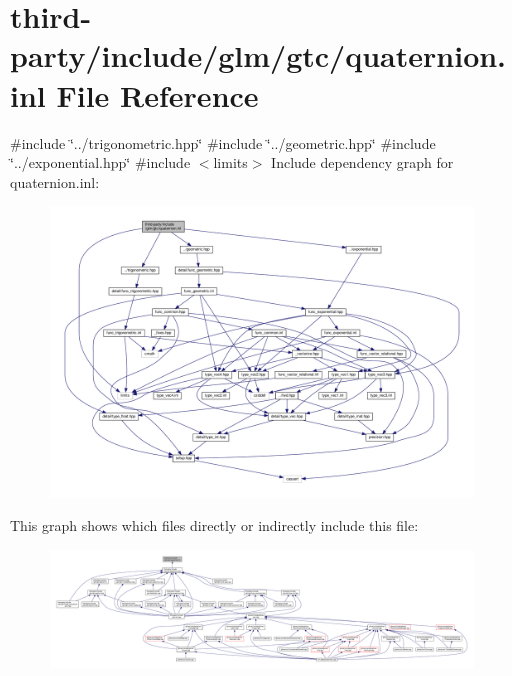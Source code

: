 \hypertarget{gtc_2quaternion_8inl}{}\section{third-\/party/include/glm/gtc/quaternion.inl File Reference}
\label{gtc_2quaternion_8inl}
{\ttfamily \#include \char`\"{}../trigonometric.\+hpp\char`\"{}}\newline
{\ttfamily \#include \char`\"{}../geometric.\+hpp\char`\"{}}\newline
{\ttfamily \#include \char`\"{}../exponential.\+hpp\char`\"{}}\newline
{\ttfamily \#include $<$limits$>$}\newline
Include dependency graph for quaternion.\+inl\+:
\nopagebreak
\begin{figure}[H]
\begin{center}
\leavevmode
\includegraphics[width=350pt]{gtc_2quaternion_8inl__incl}
\end{center}
\end{figure}
This graph shows which files directly or indirectly include this file\+:
\nopagebreak
\begin{figure}[H]
\begin{center}
\leavevmode
\includegraphics[width=350pt]{gtc_2quaternion_8inl__dep__incl}
\end{center}
\end{figure}
